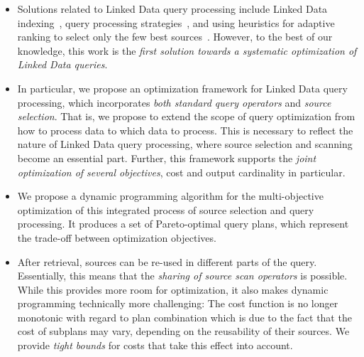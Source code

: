 \begin{itemize}
\item Solutions related to Linked Data query processing include Linked
  Data indexing~\cite{harth_data_2010}, query processing
  strategies~\cite{hartig_executing_2009,ladwig_linked_2010}, and
  using heuristics for adaptive ranking to select only the few best
  sources~\cite{ladwig_linked_2010}. However, to the best of our
  knowledge, this work is the \emph{first solution towards a
    systematic optimization of Linked Data queries}.

\item In particular, we propose an optimization framework  for Linked
  Data query processing, which incorporates \emph{both standard query
    operators} and \emph{source selection}. That is, we propose to
  extend the scope of query optimization from how to process data to
  which data to process. This is necessary to reflect the nature of
  Linked Data query processing, where source selection and scanning
  become an essential part. Further, this framework supports the
  \emph{joint optimization of several objectives}, cost and output
  cardinality in particular.

\item We propose a dynamic programming algorithm for the
  multi-objective optimization of this integrated process of source
  selection and query processing. It produces a set of Pareto-optimal
  query plans, which represent the trade-off between optimization
  objectives.
  
\item After retrieval, sources can be re-used in different parts of
  the query. Essentially, this means that the \emph{sharing of source
    scan operators} is possible. While this provides more room for
  optimization, it also makes dynamic programming technically more
  challenging: The cost function is no longer monotonic with regard to
  plan combination which is due to the fact that the cost of subplans
  may vary, depending on the reusability of their sources. We provide
  \emph{tight bounds} for costs that take this effect into account.
\end{itemize}




